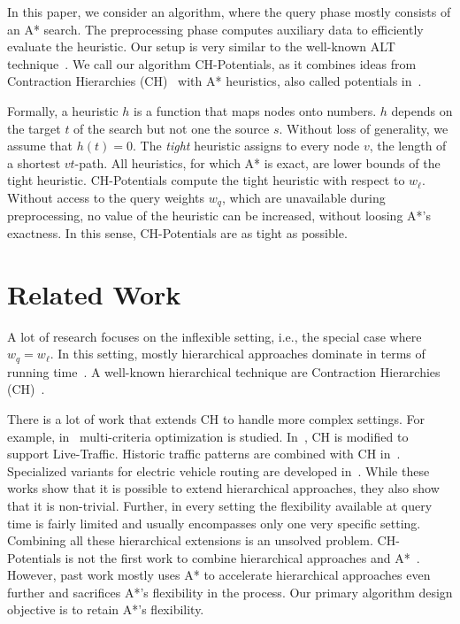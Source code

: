 \documentclass[letterpaper]{article} %
\begin{document}
In this paper, we consider an algorithm, where the query phase mostly consists of an A* search.
The preprocessing phase computes auxiliary data to efficiently evaluate the heuristic.
Our setup is very similar to the well-known ALT technique~\cite{gh-cspas-05,DBLP:conf/wea/DellingW07}.
We call our algorithm CH-Potentials, as it combines ideas from Contraction Hierarchies (CH)~\cite{gssv-erlrn-12} with A* heuristics, also called potentials in~\cite{gh-cspas-05}.

Formally, a heuristic $h$ is a function that maps nodes onto numbers.
$h$ depends on the target $t$ of the search but not one the source $s$.
Without loss of generality, we assume that $h(t)=0$.
The \emph{tight} heuristic assigns to every node $v$, the length of a shortest $vt$-path.
All heuristics, for which A* is exact, are lower bounds of the tight heuristic.
CH-Potentials compute the tight heuristic with respect to $w_\ell$.
Without access to the query weights $w_q$, which are unavailable during preprocessing, no value of the heuristic can be increased, without loosing A*'s exactness.
In this sense, CH-Potentials are as tight as possible.

\section{Related Work}

A lot of research focuses on the inflexible setting, i.e., the special case where $w_q = w_\ell$.
In this setting, mostly hierarchical approaches dominate in terms of running time~\cite{bdgmpsww-rptn-16}.
A well-known hierarchical technique are Contraction Hierarchies (CH)~\cite{gssv-erlrn-12}.

There is a lot of work that extends CH to handle more complex settings.
For example, in~\cite{fns-opca-14,gks-rpfof-10} multi-criteria optimization is studied.
In~\cite{dsw-cch-15}, CH is modified to support Live-Traffic.
Historic traffic patterns are combined with CH in~\cite{swz-sfert-19,bgsv-mtdtt-13,bdpw-dtdrp-16}.
Specialized variants for electric vehicle routing are developed in~\cite{bdgwz-sfpcs-19}.
While these works show that it is possible to extend hierarchical approaches, they also show that it is non-trivial.
Further, in every setting the flexibility available at query time is fairly limited and usually encompasses only one very specific setting.
Combining all these hierarchical extensions is an unsolved problem.
%
CH-Potentials is not the first work to combine hierarchical approaches and A*~\cite{bdsssw-chgds-10,gkw-blwr-07,bdgwz-sfpcs-19}.
However, past work mostly uses A* to accelerate hierarchical approaches even further and sacrifices A*'s flexibility in the process.
Our primary algorithm design objective is to retain A*'s flexibility.
\end{document}
